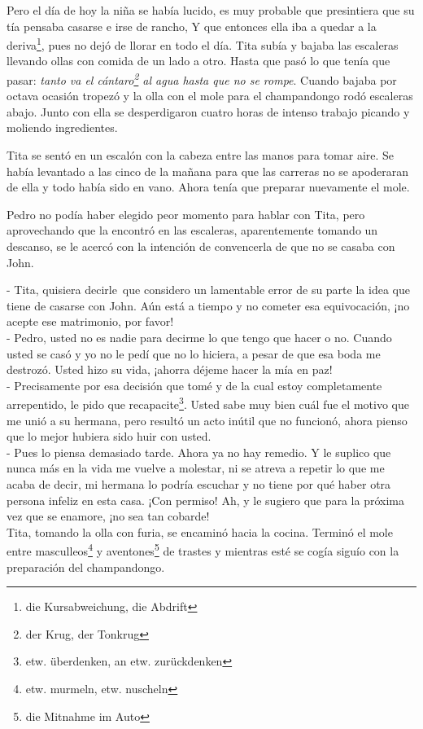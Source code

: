 Pero el día de hoy la niña se había lucido, es muy probable que
presintiera que su tía pensaba casarse e irse de rancho, Y que entonces
ella iba a quedar a la deriva\footnote{die Kursabweichung, die Abdrift},
pues no dejó de llorar en todo el día.
Tita subía y bajaba las escaleras llevando ollas con comida de un lado
a otro. Hasta que pasó lo que tenía que pasar:
\textit{tanto va el cántaro\footnote{der Krug, der Tonkrug} al agua hasta que no se rompe}.
Cuando bajaba por octava ocasión tropezó y
la olla con el mole para el champandongo rodó
escaleras abajo. Junto con ella se desperdigaron
cuatro horas de intenso trabajo picando y moliendo ingredientes.

Tita se sentó en un escalón con la cabeza entre las manos para tomar
aire. Se había levantado a las cinco de la mañana para que las carreras no
se apoderaran de ella y todo había sido en vano. Ahora tenía que
preparar nuevamente el mole.

Pedro no podía haber elegido peor momento para hablar con Tita, pero
aprovechando que la encontró en las escaleras, aparentemente tomando un
descanso, se le acercó con la intención de convencerla de que no se
casaba con John.

- Tita, quisiera decirle~que considero un lamentable error de su %
parte la idea que tiene de casarse con John. Aún está a tiempo y no %
cometer esa equivocación, ¡no acepte ese matrimonio, por favor! %
\\- Pedro, usted no es nadie para decirme lo que tengo que hacer o no. %
Cuando usted se casó y yo no le pedí que no lo hiciera, a pesar de que %
esa boda me destrozó. Usted hizo su vida, ¡ahorra déjeme hacer la mía en %
paz! %
\\- Precisamente por esa decisión que tomé y de la cual estoy %
completamente arrepentido, le pido que recapacite\footnote{etw. überdenken, an etw. zurückdenken}. %
Usted sabe muy bien cuál fue el motivo que me unió a su hermana, pero %
resultó un acto inútil que no funcionó, ahora pienso que lo mejor %
hubiera sido huir con usted. %
\\- Pues lo piensa demasiado tarde. Ahora ya no hay remedio. Y le suplico %
que nunca más en la vida me vuelve a molestar, ni se atreva a repetir lo %
que me acaba de decir, mi hermana lo podría escuchar y no tiene por qué %
haber otra persona infeliz en esta casa. ¡Con permiso! \ndots Ah, y le %
sugiero que para la próxima vez que se enamore, ¡no sea tan cobarde!\\

Tita, tomando la olla con furia, se encaminó hacia la cocina. Terminó
el mole entre masculleos\footnote{etw. murmeln, etw. nuscheln}
y aventones\footnote{die Mitnahme im Auto} de trastes y mientras
esté se cogía siguío con la preparación del champandongo.

